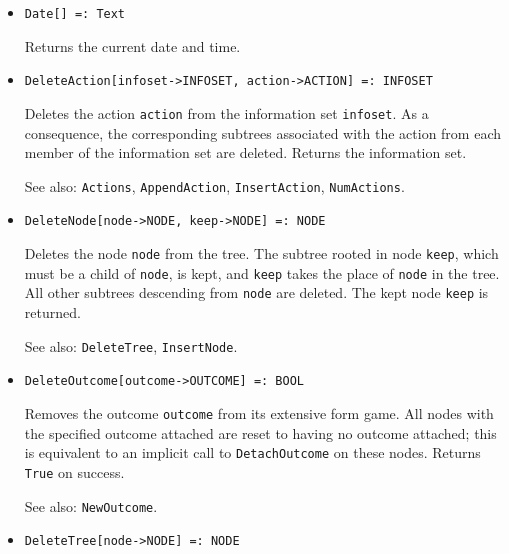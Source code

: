 \begin{itemize}

\item
\protect \large \begin{verbatim}
Date[] =: Text
\end{verbatim}\normalsize

\bd
Returns the current date and time. 
\ed

\item
\protect \large \begin{verbatim}
DeleteAction[infoset->INFOSET, action->ACTION] =: INFOSET
\end{verbatim}\normalsize

\bd
Deletes the action \verb+action+ from the information set
\verb+infoset+.  As a consequence, the corresponding subtrees associated
with the action from each member of the information set are deleted.
Returns the information set.
\item
[See also:] {\tt Actions}, {\tt AppendAction}, {\tt InsertAction},
{\tt NumActions}.
\ed

\item
\protect \large \begin{verbatim}
DeleteNode[node->NODE, keep->NODE] =: NODE
\end{verbatim}\normalsize

\bd
Deletes the node \verb+node+ from the tree.  The
subtree rooted in node \verb+keep+, which must be a child of
\verb+node+, is kept, and \verb+keep+ takes the place of \verb+node+ in
the tree.  All other subtrees descending from \verb+node+ are deleted.
The kept node \verb+keep+ is returned.
\item
[See also:] {\tt DeleteTree}, {\tt InsertNode}.
\ed

\item
\protect \large \begin{verbatim}
DeleteOutcome[outcome->OUTCOME] =: BOOL
\end{verbatim}\normalsize

\bd
Removes the outcome \verb+outcome+ from its extensive
form game.  All nodes with the specified outcome attached are reset to
having no outcome attached; this is equivalent to an implicit call to
{\tt DetachOutcome} on these nodes.  Returns \verb+True+ on success.
\item
[See also:] {\tt NewOutcome}.
\ed

\item
\protect \large \begin{verbatim}
DeleteTree[node->NODE] =: NODE
\end{verbatim}\normalsize


\end{itemize}
